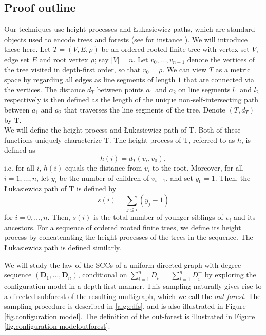 \subsection{Proof outline}\label{sec:proofoutline}

\def \exploredvertices {\mathcal V}
\def \explorededges {\mathcal E}
\def \forest {F}
\def \edgestack {\mathcal Q}

Our techniques use height processes and \L ukasiewicz paths, which are standard objects used to encode trees and forests (see for instance \cite[Chapter 0]{AST_2002__281__R1_0}). We will introduce these here. Let $T=(V,E,\rho)$ be an ordered rooted finite tree with vertex set $V$, edge set $E$ and root vertex $\rho$; say $|V|=n$. Let $v_0,\dots,v_{n-1}$ denote the vertices of the tree visited in depth-first order, so that $v_0=\rho$. We can view $T$ as a metric space by regarding all edges as line segments of length $1$ that are connected via the vertices. The distance $d_T$ between points $a_1$ and $a_2$ on line segments $l_1$ and $l_2$ respectively is then defined as the length of the unique non-self-intersecting path between $a_1$ and $a_2$ that traverses the line segments of the tree. Denote $(T,d_T)$ by $\mathrm{T}$.\\
We will define the height process and \L ukasiewicz path of $\mathrm{T}$. Both of these functions uniquely characterize $\mathrm{T}$. The height process of $\mathrm{T}$, referred to as $h$, is defined as $$h(i)=d_T(v_i,v_0),$$ i.e.  for all $i$, $h(i)$ equals the distance from $v_i$ to the root.
Moreover, for all $i=1,\dots,n$, let $y_i$ be the number of children of $v_{i-1}$, and set $y_0=1$. Then, the \L ukasiewicz path of $\mathrm{T}$ is defined by $$s(i)=\sum\limits_{j\leq i} (y_j-1)$$ for $i=0,\dots,n$. Then, $s(i)$ is the total number of younger siblings of $v_i$ and its ancestors.
For a sequence of ordered rooted finite trees, we define its height process by concatenating the height processes of the trees in the sequence. The \L ukasiewicz path is defined similarly. 

We will study the law of the SCCs of a uniform directed graph with degree sequence $(\mathbf{D}_1,\dots,\mathbf{D}_n)$, conditional on $\sum_{i=1}^n D^-_i=\sum_{i=1}^n D^+_i$ by exploring the configuration model in a depth-first manner. This sampling naturally gives rise to a directed subforest of the resulting multigraph, which we call the \emph{out-forest}. The sampling procedure is  described in \cref{alg:edfs}, and is also illustrated in Figure \ref{fig.configuration model}. The definition of the out-forest is illustrated in Figure \ref{fig.configuration modeloutforest}.  

